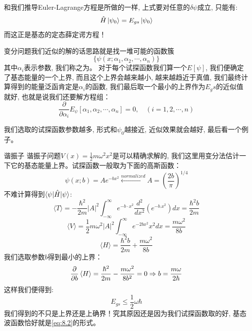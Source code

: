 \documentclass[a4paper,zihao=-4,linespread=1]{ctexrep}
\begin{document}
    和我们推导Euler-Lagrange方程是所做的一样, 上式要对任意的$\delta\psi$成立, 只能有:
    $$\hat{H}\ket{\psi_0}=E_{gs}\ket{\psi_0}$$
    而这正是基态的定态薛定谔方程！

    变分问题我们近似的解的话思路就是找一堆可能的函数簇$$\{\psi(x;\alpha_1,\alpha_2,\cdots,\alpha_n)\}$$其中$\alpha_i$表示参数, 我们称之为。
    对于每个试探函数我们算一个$E[\psi]$, 我们便确定了基态能量的一个上界, 而且这个上界会越来越小, 越来越趋近于真值, 我们最终计算得到的能量泛函肯定是$\alpha_i$的函数,
    我们最后取一个最小的上界作为$E_gs$的近似值就好, 也就是说我们还要解方程组：
    \[\frac{\partial}{\partial\alpha_i}E_\psi[\alpha_1,\alpha_2,\cdots,\alpha_n]=0,\quad (i=1,2,\cdots,n)\]

    我们选取的试探函数参数越多, 形式和$\psi_0$越接近, 近似效果就会越好, 最后看一个例子。
    \begin{example}{谐振子}
        谐振子问题$V(x)=\frac{1}{2}m\omega^2x^2$是可以精确求解的, 我们这里用变分法估计一下它的基态能量上界。试探函数一般取为下面的高斯函数：
        \begin{equation}
            \label{eq:8.2}
            \psi(x;b)=Ae^{-bx^2}\xleftarrow[]{normalized}A=\left(\frac{2b}{\pi}\right)^{1/4}
        \end{equation}
    不难计算得到$\braket{\psi|\hat{H}|\psi}$:
    \begin{equation*}
        \langle T\rangle=-\frac{\hbar^{2}}{2 m}|A|^{2} \int_{-\infty}^{\infty} e^{-b \cdot x^{2}} \frac{d^{2}}{d x^{2}}\left(e^{-b . x^{2}}\right) d x=\frac{\hbar^{2} b}{2 m}
    \end{equation*}
    \begin{equation*}
        \langle V\rangle=\frac{1}{2} m \omega^{2}|A|^{2} \int_{-\infty}^{\infty} e^{-2 b x^{2}} x^{2} d x=\frac{m \omega^{2}}{8 b}
    \end{equation*}
    \begin{equation*}
        \langle H\rangle=\frac{\hbar^{2} b}{2 m}+\frac{m \omega^{2}}{8 b}
    \end{equation*}
    我们选取参数$b$得到最小的上界：
    \begin{equation*}
        \frac{\partial}{\partial b}\braket{H}=\frac{\hbar^2}{2m}-\frac{m\omega^2}{8b^2}=0\Rightarrow b=\frac{m\omega}{2\hbar}
    \end{equation*}
    这样我们便得到:
    \begin{equation*}
        E_{gs}\leq\frac{1}{2}\omega\hbar
    \end{equation*}
    我们得到的不只是上界还是上确界！究其原因还是因为我们试探函数取的好, 基态波函数恰好就是\ref{eq:8.2}的形式。
    \end{example}
\end{document}
